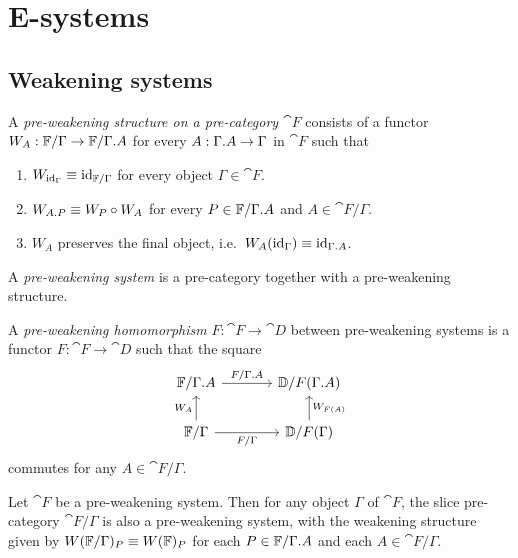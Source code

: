 \section{E-systems}\label{sec:esys_defn}

\subsection{Weakening systems}

\begin{defn}
A \emph{pre-weakening structure on a pre-category $\cat{F}$} consists of a functor
$W_A:\cat{F}/\Gamma\to \cat{F}/\ctxext{\Gamma}{A}$ for every $A:\ctxext{\Gamma}{A}\to \Gamma$ in $\cat{F}$ such 
that
\begin{enumerate}
\item $W_{{\mathrm{id}_{\Gamma}}}\equiv {\mathrm{id}_{\mathbb{F}/\Gamma}}$ for every object $\Gamma\in\cat{F}$.
\item $W_{\ctxext{A}{P}}\jdeq W_P\circ W_A$ for every $P\in\cat{F}/\ctxext{\Gamma}{A}$ and $A\in\cat{F}/\Gamma$.
\item $W_A$ preserves the final object, i.e.~$W_A(\catid{\Gamma})\jdeq \catid{\ctxext{\Gamma}{A}}$.
\end{enumerate}
A \emph{pre-weakening system} is a pre-category together with a pre-weakening structure.
\end{defn}

\begin{defn}
A \emph{pre-weakening homomorphism} $F:\cat{F}\to\cat{D}$ between pre-weakening systems
is a functor $F:\cat{F}\to\cat{D}$ such that the square
\begin{equation*}
\begin{tikzcd}[column sep=large]
\cat{F}/\ctxext{\Gamma}{A}
  \arrow[r,"F/\ctxext{\Gamma}{A}"]
  &
\cat{D}/F(\ctxext{\Gamma}{A})
  \\
\cat{F}/\Gamma
  \arrow[u,"W_A"]
  \arrow[r,swap,"F/\Gamma"]
  &
\cat{D}/F(\Gamma)
  \arrow[u,swap,"W_{F(A)}"]
\end{tikzcd}
\end{equation*}
commutes for any $A\in\cat{F}/\Gamma$.
\end{defn}

\begin{lem}
Let $\cat{F}$ be a pre-weakening system. Then for any object $\Gamma$ of $\cat{F}$,
the slice pre-category $\cat{F}/\Gamma$ is also a pre-weakening system, with the weakening
structure given by $W(\mathbb{F}/\Gamma)_P\equiv W(\mathbb{F})_P$ for each $P\in\cat{F}/\ctxext{\Gamma}{A}$
and each $A\in\cat{F}/\Gamma$.
\end{lem}

